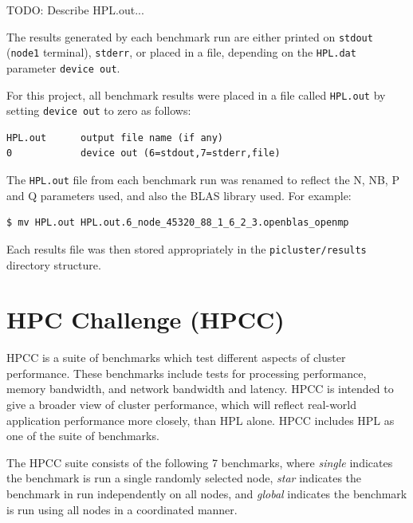 \documentclass{report}
\begin{document}
TODO: Describe HPL.out...

The results generated by each benchmark run are either printed on \verb|stdout| (\verb|node1| terminal), \verb|stderr|, or placed in a file, depending on the \verb|HPL.dat| parameter \verb|device out|.

For this project, all benchmark results were placed in a file called \verb|HPL.out| by setting \verb|device out| to zero as follows:

\lstset{style=listing}
\begin{lstlisting}[numbers=none, caption=HPL.dat]
HPL.out      output file name (if any)
0            device out (6=stdout,7=stderr,file)
\end{lstlisting}


The \verb|HPL.out| file from each benchmark run was renamed to reflect the N, NB, P and Q parameters used, and also the BLAS library used. For example:

\lstset{style=type}
\begin{lstlisting}
$ mv HPL.out HPL.out.6_node_45320_88_1_6_2_3.openblas_openmp
\end{lstlisting}

Each results file was then stored appropriately in the \verb|picluster/results| directory structure. 


%





%
%
\section{HPC Challenge (HPCC)}

HPCC is a suite of benchmarks which test different aspects of cluster performance. These benchmarks include tests for processing performance, memory bandwidth, and network bandwidth and latency. HPCC is intended to give a broader view of cluster performance, which will reflect real-world application performance more closely, than HPL alone. HPCC includes HPL as one of the suite of benchmarks.

The HPCC suite consists of the following 7 benchmarks, where \emph{single} indicates the benchmark is run a single randomly selected node, \emph{star} indicates the benchmark in run independently on all nodes, and \emph{global} indicates the benchmark is run using all nodes in a coordinated manner. 
\end{document}
